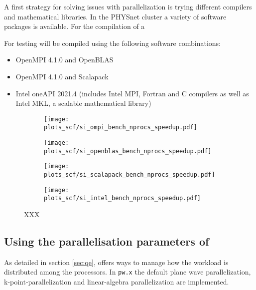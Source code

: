 \documentclass[main.tex]{subfiles}
\begin{document}
A first strategy for solving issues with parallelization is trying different compilers and mathematical libraries.
In the PHYSnet cluster a variety of software packages is available.
For the compilation of \QE a 

For testing \QE will be compiled using the following software combinations:
\begin{itemize}
    \item OpenMPI 4.1.0 and OpenBLAS
    \item OpenMPI 4.1.0 and Scalapack
    \item Intel oneAPI 2021.4 (includes Intel MPI, Fortran and C compilers as well as Intel MKL, a scalable mathematical library)
\end{itemize}

\begin{figure}[h!]
\begin{subfigure}[b]{0.4\textwidth}
    \centering
    \texttt{[image: plots\_scf/si\_ompi\_bench\_nprocs\_speedup.pdf]}
\end{subfigure}
\begin{subfigure}[b]{0.4\textwidth}
    \centering
    \texttt{[image: plots\_scf/si\_openblas\_bench\_nprocs\_speedup.pdf]}
\end{subfigure}
\begin{subfigure}[b]{0.4\textwidth}
    \centering
    \texttt{[image: plots\_scf/si\_scalapack\_bench\_nprocs\_speedup.pdf]}
\end{subfigure}
\begin{subfigure}[b]{0.4\textwidth}
    \centering
    \texttt{[image: plots\_scf/si\_intel\_bench\_nprocs\_speedup.pdf]}
\end{subfigure}
\caption{XXX}
\label{fig:scaling_compilers_nprocs}
\end{figure}


\subsection{Using the parallelisation parameters of \QE}

As detailed in section \ref{sec:qe}, \QE offers ways to manage how the workload is distributed among the processors.
In \texttt{pw.x} the default plane wave parallelization, k-point-parallelization and linear-algebra parallelization are implemented.
\end{document}
